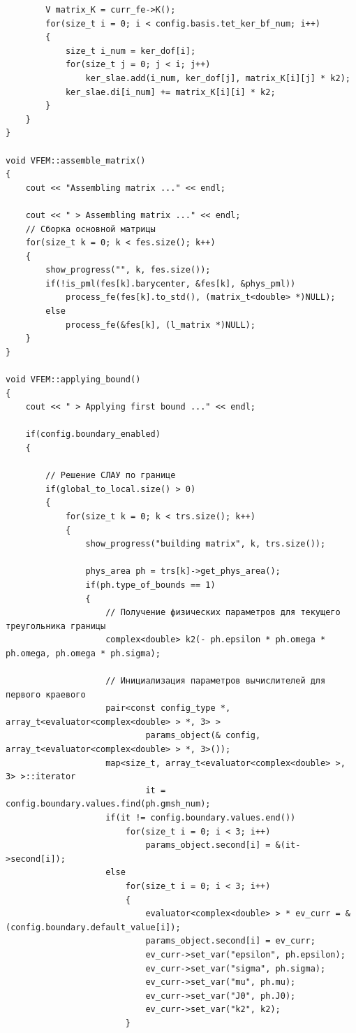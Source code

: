 \documentclass[a4paper,12pt]{article}
\begin{document}
\begin{singlespace}
\begin{tiny}
\begin{verbatim}
        V matrix_K = curr_fe->K();
        for(size_t i = 0; i < config.basis.tet_ker_bf_num; i++)
        {
            size_t i_num = ker_dof[i];
            for(size_t j = 0; j < i; j++)
                ker_slae.add(i_num, ker_dof[j], matrix_K[i][j] * k2);
            ker_slae.di[i_num] += matrix_K[i][i] * k2;
        }
    }
}

void VFEM::assemble_matrix()
{
    cout << "Assembling matrix ..." << endl;

    cout << " > Assembling matrix ..." << endl;
    // Cборка основной матрицы
    for(size_t k = 0; k < fes.size(); k++)
    {
        show_progress("", k, fes.size());
        if(!is_pml(fes[k].barycenter, &fes[k], &phys_pml))
            process_fe(fes[k].to_std(), (matrix_t<double> *)NULL);
        else
            process_fe(&fes[k], (l_matrix *)NULL);
    }
}

void VFEM::applying_bound()
{
    cout << " > Applying first bound ..." << endl;

    if(config.boundary_enabled)
    {

        // Решение СЛАУ по границе
        if(global_to_local.size() > 0)
        {
            for(size_t k = 0; k < trs.size(); k++)
            {
                show_progress("building matrix", k, trs.size());

                phys_area ph = trs[k]->get_phys_area();
                if(ph.type_of_bounds == 1)
                {
                    // Получение физических параметров для текущего треугольника границы
                    complex<double> k2(- ph.epsilon * ph.omega * ph.omega, ph.omega * ph.sigma);

                    // Инициализация параметров вычислителей для первого краевого
                    pair<const config_type *, array_t<evaluator<complex<double> > *, 3> >
                            params_object(& config, array_t<evaluator<complex<double> > *, 3>());
                    map<size_t, array_t<evaluator<complex<double> >, 3> >::iterator
                            it = config.boundary.values.find(ph.gmsh_num);
                    if(it != config.boundary.values.end())
                        for(size_t i = 0; i < 3; i++)
                            params_object.second[i] = &(it->second[i]);
                    else
                        for(size_t i = 0; i < 3; i++)
                        {
                            evaluator<complex<double> > * ev_curr = &(config.boundary.default_value[i]);
                            params_object.second[i] = ev_curr;
                            ev_curr->set_var("epsilon", ph.epsilon);
                            ev_curr->set_var("sigma", ph.sigma);
                            ev_curr->set_var("mu", ph.mu);
                            ev_curr->set_var("J0", ph.J0);
                            ev_curr->set_var("k2", k2);
                        }


\end{verbatim}
\end{tiny}
\end{singlespace}
\end{document}
